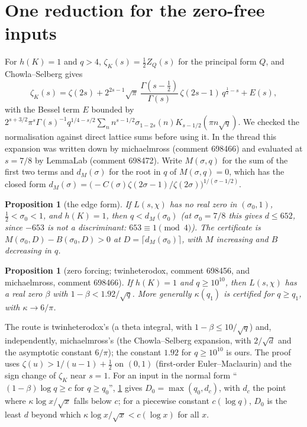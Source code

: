 \documentclass[11pt]{article}
\newtheorem{proposition}[theorem]{Proposition}
\theoremstyle{definition}
\begin{document}
\section{One reduction for the zero-free inputs}\label{sec:reduction}
For $h(K) = 1$ and $q > 4$, $\zeta_K(s) = \tfrac12 Z_Q(s)$ for the principal form $Q$, and Chowla--Selberg \cite{ChowlaSelberg1967} gives
\begin{equation}\label{eq:cs}
\zeta_K(s) = \zeta(2s) + 2^{2s-1}\sqrt\pi\,\frac{\Gamma(s-\frac12)}{\Gamma(s)}\,\zeta(2s-1)\,q^{\frac12 - s} + E(s),
\end{equation}
with the Bessel term $E$ bounded by $2^{s+3/2}\pi^s\Gamma(s)^{-1}q^{1/4-s/2}\sum_n n^{s-1/2}\sigma_{1-2s}(n)K_{s-1/2}(\pi n\sqrt q)$. We checked the normalisation against direct lattice sums before using it. In the thread this expansion was written down by michaelmross (comment 698466) and evaluated at $s = 7/8$ by LemmaLab (comment 698472). Write $M(\sigma, q)$ for the sum of the first two terms and $d_M(\sigma)$ for the root in $q$ of $M(\sigma, q) = 0$, which has the closed form $d_M(\sigma) = \bigl(-C(\sigma)\zeta(2\sigma-1)/\zeta(2\sigma)\bigr)^{1/(\sigma-1/2)}$.

\begin{proposition}[the edge form]\label{prop:edge}
If $L(s,\chi)$ has no real zero in $(\sigma_0, 1)$, $\tfrac12 < \sigma_0 < 1$, and $h(K) = 1$, then $q < d_M(\sigma_0)$ (at $\sigma_0 = 7/8$ this gives $d \le 652$, since $-653$ is not a discriminant: $653 \equiv 1 \pmod 4$). The certificate is $M(\sigma_0, D) - B(\sigma_0, D) > 0$ at $D = \lceil d_M(\sigma_0)\rceil$, with $M$ increasing and $B$ decreasing in $q$.
\end{proposition}

\begin{proposition}[zero forcing; twinheterodox, comment 698456, and michaelmross, comment 698466]\label{prop:zero}
If $h(K) = 1$ and $q \ge 10^{10}$, then $L(s,\chi)$ has a real zero $\beta$ with $1 - \beta < 1.92/\sqrt q$. More generally $\kappa(q_1)$ is certified for $q \ge q_1$, with $\kappa \to 6/\pi$.
\end{proposition}
The route is twinheterodox's (a theta integral, with $1-\beta \le 10/\sqrt q$) and, independently, michaelmross's (the Chowla--Selberg expansion, with $2/\sqrt d$ and the asymptotic constant $6/\pi$); the constant $1.92$ for $q \ge 10^{10}$ is ours. The proof uses $\zeta(u) > 1/(u-1) + \frac12$ on $(0,1)$ (first-order Euler--Maclaurin) and the sign change of $\zeta_K$ near $s = 1$. For an input in the normal form ``$(1-\beta)\log q \ge c$ for $q \ge q_0$'', \cref{prop:zero} gives $D_0 = \max(q_0, d_c)$, with $d_c$ the point where $\kappa\log x/\sqrt x$ falls below $c$; for a piecewise constant $c(\log q)$, $D_0$ is the least $d$ beyond which $\kappa\log x/\sqrt x < c(\log x)$ for all $x$.
\end{document}
